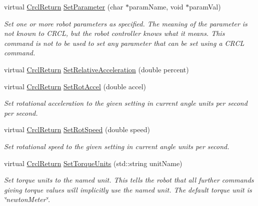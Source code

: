 \begin{DoxyCompactItemize}
virtual \hyperlink{namespaceCrcl_a1ed3b29723118a020251dde9b12733c0}{Crcl\-Return} \hyperlink{classCrcl_1_1CrclDelegateInterface_a961922ae3370ba783a6efd49c60b2615}{Set\-Parameter} (char $\ast$param\-Name, void $\ast$param\-Val)
\begin{DoxyCompactList}\small\item\em Set one or more robot parameters as specified. The meaning of the parameter is not known to C\-R\-C\-L, but the robot controller knows what it means. This command is not to be used to set any parameter that can be set using a C\-R\-C\-L command. \end{DoxyCompactList}\item 
virtual \hyperlink{namespaceCrcl_a1ed3b29723118a020251dde9b12733c0}{Crcl\-Return} \hyperlink{classCrcl_1_1CrclDelegateInterface_a75b341b2b89b4e2c8994f0f8f9090a8c}{Set\-Relative\-Acceleration} (double percent)
\item 
virtual \hyperlink{namespaceCrcl_a1ed3b29723118a020251dde9b12733c0}{Crcl\-Return} \hyperlink{classCrcl_1_1CrclDelegateInterface_afc10167b3d7468331c434b60b7f8f737}{Set\-Rot\-Accel} (double accel)
\begin{DoxyCompactList}\small\item\em Set rotational acceleration to the given setting in current angle units per second per second. \end{DoxyCompactList}\item 
virtual \hyperlink{namespaceCrcl_a1ed3b29723118a020251dde9b12733c0}{Crcl\-Return} \hyperlink{classCrcl_1_1CrclDelegateInterface_ab27eaeb82b7b859cf17addcade824829}{Set\-Rot\-Speed} (double speed)
\begin{DoxyCompactList}\small\item\em Set rotational speed to the given setting in current angle units per second. \end{DoxyCompactList}\item 
virtual \hyperlink{namespaceCrcl_a1ed3b29723118a020251dde9b12733c0}{Crcl\-Return} \hyperlink{classCrcl_1_1CrclDelegateInterface_addfaf2d1240dcca39c813c1de09f81a1}{Set\-Torque\-Units} (std\-::string unit\-Name)
\begin{DoxyCompactList}\small\item\em Set torque units to the named unit. This tells the robot that all further commands giving torque values will implicitly use the named unit. The default torque unit is \char`\"{}newton\-Meter\char`\"{}. \end{DoxyCompactList}\item 

\end{DoxyCompactItemize}
